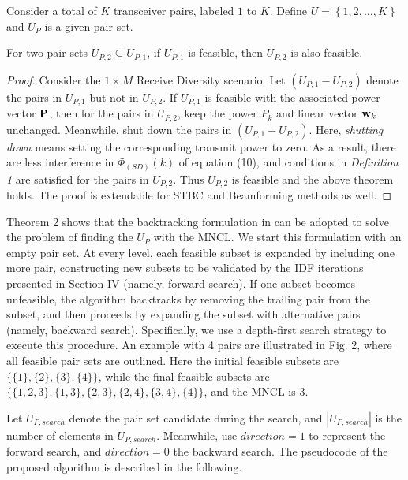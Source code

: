\documentclass[draftcls,onecolumn,peerview,12pt]{IEEEtran}
\begin{document}
Consider a total of $K$ transceiver pairs, labeled $1$ to $K$.
Define $U=\left\{1,2,\ldots,K\right\}$ and $U_P$ is a given pair
set.

\begin{theorem}
For two pair sets $U_{P,2}\subseteq U_{P,1}$, if $U_{P,1}$ is
feasible, then $U_{P,2}$ is also feasible.
\end{theorem}

\begin{proof}
Consider the $1\times M$ Receive Diversity scenario. Let
$\left(U_{P,1}-U_{P,2}\right)$ denote the pairs in $U_{P,1}$ but not
in $U_{P,2}$. If $U_{P,1}$ is feasible with the associated power
vector $\rm{\bf P}$, then for the pairs in $U_{P,2}$, keep the power
$P_k$ and linear vector ${\rm{\bf w}}_k$ unchanged. Meanwhile, shut
down the pairs in $\left(U_{P,1}-U_{P,2}\right)$. Here,
\textit{shutting down} means setting the corresponding transmit
power to zero. As a result, there are less interference in
${\Phi_{(SD)}(k)}$ of equation (10), and conditions in
\textit{Definition 1} are satisfied for the pairs in $U_{P,2}$. Thus
$U_{P,2}$ is feasible and the above theorem holds. The proof is
extendable for STBC and Beamforming methods as well.
\end{proof}

Theorem 2 shows that the backtracking formulation in
\cite{9_interference_temp, 24_computer_algorithms} can be adopted to
solve the problem of finding the $U_P$ with the MNCL. We start this
formulation with an empty pair set. At every level, each feasible
subset is expanded by including one more pair, constructing new
subsets to be validated by the IDF iterations presented in Section
IV (namely, forward search). If one subset becomes unfeasible, the
algorithm backtracks by removing the trailing pair from the subset,
and then proceeds by expanding the subset with alternative pairs
(namely, backward search). Specifically, we use a depth-first search
strategy to execute this procedure. An example with 4 pairs are
illustrated in Fig. 2, where all feasible pair sets are outlined.
Here the initial feasible subsets are $\{ \{1\}, \{2\}, \{3\}, \{4\}
\}$, while the final feasible subsets are $\{ \{1,2,3\}, \{1,3\},
\{2,3\}, \{2,4\}, \{3,4\}, \{4\} \}$, and the MNCL is 3.



Let $U_{P,search}$ denote the pair set candidate during the search,
and $\left| {U_{P,search} } \right|$ is the number of elements in
$U_{P,search} $. Meanwhile, use $direction=1$ to represent the
forward search, and $direction=0$ the backward search. The
pseudocode of the proposed algorithm is described in the following.
\end{document}
